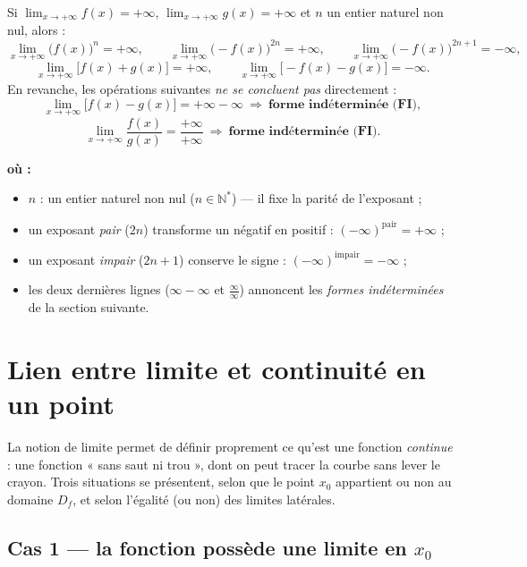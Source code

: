 \documentclass[11pt,a4paper]{article}
\newenvironment{ou}{%
  \par\smallskip\noindent\textbf{où :}\nopagebreak
  \begin{itemize}[leftmargin=1.8em,topsep=2pt,itemsep=1.5pt,parsep=0pt]}%
  {\end{itemize}}
\begin{document}
\begin{theoreme}
Si $\displaystyle\lim_{x\to+\infty} f(x)=+\infty$, $\displaystyle\lim_{x\to+\infty} g(x)=+\infty$
et $n$ un entier naturel non nul, alors :
\[
\lim_{x\to+\infty}\bigl(f(x)\bigr)^{n}=+\infty,\qquad
\lim_{x\to+\infty}\bigl(-f(x)\bigr)^{2n}=+\infty,\qquad
\lim_{x\to+\infty}\bigl(-f(x)\bigr)^{2n+1}=-\infty,
\]
\[
\lim_{x\to+\infty}\bigl[f(x)+g(x)\bigr]=+\infty,\qquad
\lim_{x\to+\infty}\bigl[-f(x)-g(x)\bigr]=-\infty.
\]
En revanche, les opérations suivantes \emph{ne se concluent pas} directement :
\[
\lim_{x\to+\infty}\bigl[f(x)-g(x)\bigr]=+\infty-\infty\ \Rightarrow\ \textbf{forme indéterminée (FI)},
\]
\[
\lim_{x\to+\infty}\frac{f(x)}{g(x)}=\frac{+\infty}{+\infty}\ \Rightarrow\ \textbf{forme indéterminée (FI)}.
\]
\end{theoreme}

\begin{ou}
  \item $n$ : un entier naturel non nul ($n\in\mathbb{N}^{*}$) — il fixe la parité de l'exposant ;
  \item un exposant \emph{pair} ($2n$) transforme un négatif en positif : $(-\infty)^{\text{pair}}=+\infty$ ;
  \item un exposant \emph{impair} ($2n+1$) conserve le signe : $(-\infty)^{\text{impair}}=-\infty$ ;
  \item les deux dernières lignes ($\infty-\infty$ et $\tfrac{\infty}{\infty}$) annoncent les \emph{formes indéterminées} de la section suivante.
\end{ou}

\section{Lien entre limite et continuité en un point}
La notion de limite permet de définir proprement ce qu'est une fonction \emph{continue} : une
fonction « sans saut ni trou », dont on peut tracer la courbe sans lever le crayon. Trois
situations se présentent, selon que le point $x_0$ appartient ou non au domaine $D_f$, et selon
l'égalité (ou non) des limites latérales.

\subsection{Cas 1 — la fonction possède une limite en \texorpdfstring{$x_0$}{x0}}
\end{document}
